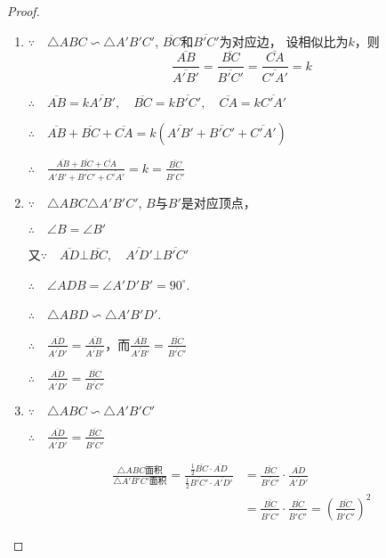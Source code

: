 \begin{proof}
\begin{enumerate}
    \item $\because\quad \triangle ABC\backsim \triangle A'B'C'$, $\overline{BC}$和$\overline{B'C'}$为对应边，
    设相似比为$k$，则
\[\frac{\overline{AB}}{\overline{A'B'}}=\frac{\overline{BC}}{\overline{B'C'}}=\frac{\overline{CA}}{\overline{C'A'}}=k\]

$\therefore\quad \overline{AB}=k\overline{A'B'},\quad  \overline{BC}=k\overline{B'C'},\quad \overline{CA}= k\overline{C'A'}$

$\therefore\quad \overline{AB}+\overline{BC}+\overline{CA}=k\left(\overline{A'B'}+\overline{B'C'}+\overline{C'A'}\right)$

$\therefore\quad \frac{\overline{AB} + \overline{BC} +\overline{CA}}{\overline{A'B'} + \overline{B'C'} +\overline{C'A'}}=k=\frac{\overline{BC}}{\overline{B'C'}}$

\item $\because\quad \triangle ABC\triangle A'B'C'$, $B$与$B'$是对应顶点，

$\therefore\quad \angle B=\angle B'$

    又$\because\quad \overline{AD}\bot \overline{BC},\quad \overline{A'D'}\bot \overline{B'C'}$

$\therefore\quad \angle ADB=\angle A'D'B'=90^{\circ}$.

$\therefore\quad \triangle ABD\backsim \triangle A'B'D'$.

$\therefore\quad \frac{\overline{AD}}{\overline{A'D'}}=\frac{\overline{AB}}{\overline{A'B'}}$，而$\frac{\overline{AB}}{\overline{A'B'}}=\frac{\overline{BC}}{\overline{B'C'}}$

$\therefore\quad \frac{\overline{AD}}{\overline{A'D'}}=\frac{\overline{BC}}{\overline{B'C'}}$

\item $\because\quad \triangle ABC\backsim \triangle A'B'C'$

$\therefore\quad \frac{\overline{AD}}{\overline{A'D'}}=\frac{\overline{BC}}{\overline{B'C'}}$

\[\begin{split}
\frac{\triangle ABC\text{面积}}{\triangle A'B'C'\text{面积}}
=\frac{\frac{1}{2}\overline{BC}\cdot \overline{AD}}{\frac{1}{2}\overline{B'C'}\cdot \overline{A'D'}}&=\frac{\overline{BC} }{\overline{B'C'}}\cdot\frac{\overline{AD}}{\overline{A'D'}}\\
&=\frac{\overline{BC} }{\overline{B'C'}}\cdot\frac{\overline{BC} }{\overline{B'C'}}=\left(\frac{\overline{BC}}{\overline{B'C'}}\right)^2    
\end{split}\]
\end{enumerate}
\end{proof}


